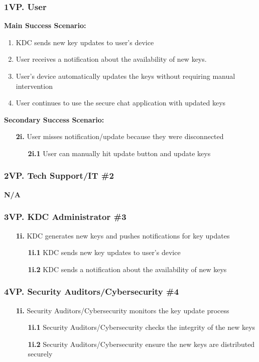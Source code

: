 \documentclass[]{article}
\begin{document}
\subsubsection*{1VP. User}
\textbf{Main Success Scenario:}
\begin{enumerate}
	\item KDC sends new key updates to user’s device
	\item User receives a notification about the availability of new keys.
	\item User's device automatically updates the keys without requiring manual intervention
	\item User continues to use the secure chat application with updated keys
\end{enumerate}
\textbf{Secondary Success Scenario:}
\begin{enumerate}
	\item[\textbf{2i.}] User misses notification/update because they were disconnected
		\begin{enumerate}
			\item[\textbf{2i.1}] User can manually hit update button and update keys
		\end{enumerate}
\end{enumerate}
\subsubsection*{2VP. Tech Support/IT \#2}
\textbf{N/A}
\subsubsection*{3VP. KDC Administrator \#3}
\begin{enumerate}
	\item[\textbf{1i.}] KDC generates new keys and pushes notifications for key updates
		\begin{enumerate}
			\item[\textbf{1i.1}] KDC sends new key updates to user’s device
			\item[\textbf{1i.2}] KDC sends a notification about the availability of new keys
		\end{enumerate}
\end{enumerate}
\subsubsection*{4VP. Security Auditors/Cybersecurity \#4}
\begin{enumerate}
	\item[\textbf{1i.}] Security Auditors/Cybersecurity monitors the key update process
		\begin{enumerate}
			\item[\textbf{1i.1}] Security Auditors/Cybersecurity checks the integrity of the new keys
			\item[\textbf{1i.2}] Security Auditors/Cybersecurity ensure the new keys are distributed securely
		\end{enumerate}
\end{enumerate}
\end{document}
